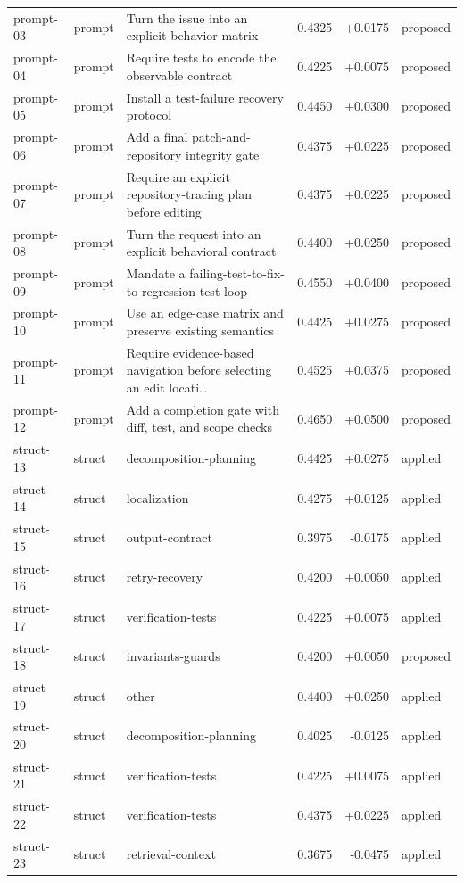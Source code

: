 \begin{center}
\begin{longtable}{llp{5.2cm}rrl}
prompt-03 & prompt & Turn the issue into an explicit behavior matrix & 0.4325 & +0.0175 & proposed \\
prompt-04 & prompt & Require tests to encode the observable contract & 0.4225 & +0.0075 & proposed \\
prompt-05 & prompt & Install a test-failure recovery protocol & 0.4450 & +0.0300 & proposed \\
prompt-06 & prompt & Add a final patch-and-repository integrity gate & 0.4375 & +0.0225 & proposed \\
prompt-07 & prompt & Require an explicit repository-tracing plan before editing & 0.4375 & +0.0225 & proposed \\
prompt-08 & prompt & Turn the request into an explicit behavioral contract & 0.4400 & +0.0250 & proposed \\
prompt-09 & prompt & Mandate a failing-test-to-fix-to-regression-test loop & 0.4550 & +0.0400 & proposed \\
prompt-10 & prompt & Use an edge-case matrix and preserve existing semantics & 0.4425 & +0.0275 & proposed \\
prompt-11 & prompt & Require evidence-based navigation before selecting an edit locati\ldots{} & 0.4525 & +0.0375 & proposed \\
prompt-12 & prompt & Add a completion gate with diff, test, and scope checks & 0.4650 & +0.0500 & proposed \\
struct-13 & struct & decomposition-planning & 0.4425 & +0.0275 & applied \\
struct-14 & struct & localization & 0.4275 & +0.0125 & applied \\
struct-15 & struct & output-contract & 0.3975 & -0.0175 & applied \\
struct-16 & struct & retry-recovery & 0.4200 & +0.0050 & applied \\
struct-17 & struct & verification-tests & 0.4225 & +0.0075 & applied \\
struct-18 & struct & invariants-guards & 0.4200 & +0.0050 & proposed \\
struct-19 & struct & other & 0.4400 & +0.0250 & applied \\
struct-20 & struct & decomposition-planning & 0.4025 & -0.0125 & applied \\
struct-21 & struct & verification-tests & 0.4225 & +0.0075 & applied \\
struct-22 & struct & verification-tests & 0.4375 & +0.0225 & applied \\
struct-23 & struct & retrieval-context & 0.3675 & -0.0475 & applied \\

\end{longtable}
\end{center}

